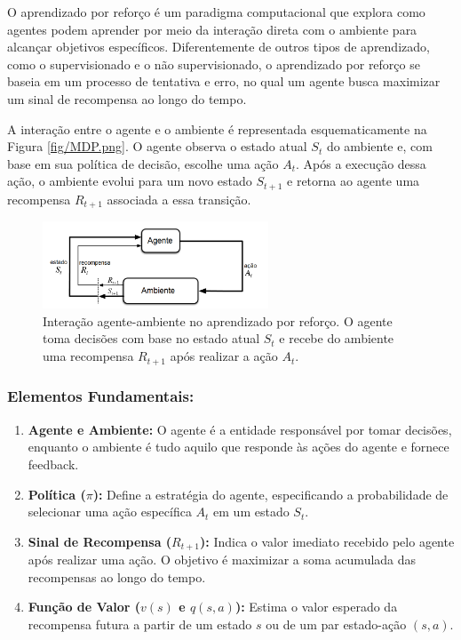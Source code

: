 O aprendizado por reforço é um paradigma computacional que explora como agentes podem aprender por meio da interação direta com o ambiente para alcançar objetivos específicos. Diferentemente de outros tipos de aprendizado, como o supervisionado e o não supervisionado, o aprendizado por reforço se baseia em um processo de tentativa e erro, no qual um agente busca maximizar um sinal de recompensa ao longo do tempo.

A interação entre o agente e o ambiente é representada esquematicamente na Figura \ref{fig/MDP.png}. O agente observa o estado atual \( S_t \) do ambiente e, com base em sua política de decisão, escolhe uma ação \( A_t \). Após a execução dessa ação, o ambiente evolui para um novo estado \( S_{t+1} \) e retorna ao agente uma recompensa \( R_{t+1} \) associada a essa transição.

\begin{figure}[h]
    \centering
    \includegraphics[width=0.6\textwidth]{fig/MDP.png}
    \caption{Interação agente-ambiente no aprendizado por reforço. O agente toma decisões com base no estado atual \( S_t \) e recebe do ambiente uma recompensa \( R_{t+1} \) após realizar a ação \( A_t \).}
    \label{fig:agent_env_interaction}
\end{figure}

\subsubsection*{Elementos Fundamentais:}
\begin{enumerate}
    \item \textbf{Agente e Ambiente:} O agente é a entidade responsável por tomar decisões, enquanto o ambiente é tudo aquilo que responde às ações do agente e fornece feedback.
    \item \textbf{Política (\(\pi\)):} Define a estratégia do agente, especificando a probabilidade de selecionar uma ação específica \( A_t \) em um estado \( S_t \).
    \item \textbf{Sinal de Recompensa (\(R_{t+1}\)):} Indica o valor imediato recebido pelo agente após realizar uma ação. O objetivo é maximizar a soma acumulada das recompensas ao longo do tempo.
    \item \textbf{Função de Valor (\(v(s)\) e \(q(s, a)\)):} Estima o valor esperado da recompensa futura a partir de um estado \( s \) ou de um par estado-ação \( (s, a) \).
\end{enumerate}

